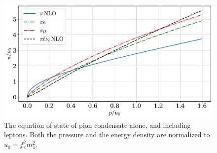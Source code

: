 \begin{figure}[!htb]
    \centering
    \includegraphics[width=.82\textwidth]{../scripts/figurer/pion_star/pion_all_eos.pdf}
    \caption{
        The equation of state of pion condensate alone, and including leptons.
        Both the pressure and the energy density are normalized to $u_0 = f_\pi^2 m_\pi^2$.
    }
    \label{fig: all eos}
\end{figure}


